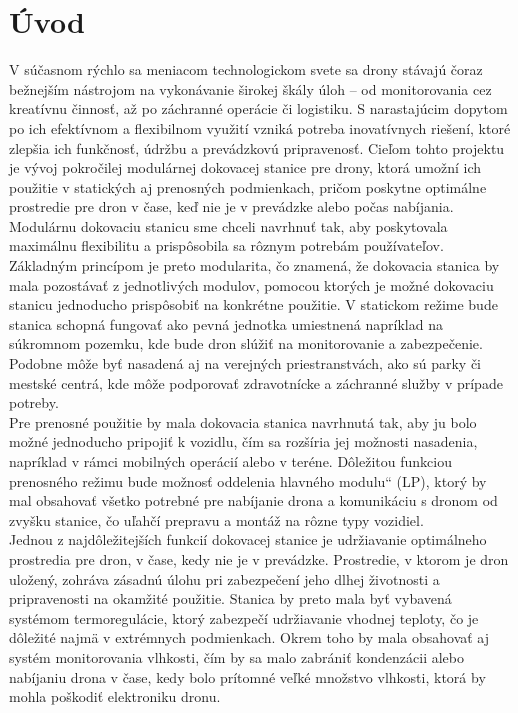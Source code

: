 \documentclass[a4paper]{article}
\newcommand\uvoz[1]{\quotedblbase #1\textquotedblleft}%
\begin{document}
\section{Úvod}
V súčasnom rýchlo sa meniacom technologickom svete sa drony stávajú čoraz bežnejším nástrojom na vykonávanie širokej škály úloh – od monitorovania cez kreatívnu činnosť, až po záchranné operácie či logistiku. S narastajúcim dopytom po ich efektívnom a flexibilnom využití vzniká potreba inovatívnych riešení, ktoré zlepšia ich funkčnosť, údržbu a prevádzkovú pripravenosť. Cieľom tohto projektu je vývoj pokročilej modulárnej dokovacej stanice pre drony, ktorá umožní ich použitie v statických aj prenosných podmienkach, pričom poskytne optimálne prostredie pre dron v čase, keď nie je v prevádzke alebo počas nabíjania.\\

\noindent
Modulárnu dokovaciu stanicu sme chceli navrhnuť tak, aby poskytovala maximálnu flexibilitu a prispôsobila sa rôznym potrebám používateľov. Základným princípom je preto modularita, čo znamená, že dokovacia stanica by mala pozostávať z jednotlivých modulov, pomocou ktorých je možné dokovaciu stanicu jednoducho prispôsobiť na konkrétne použitie. V statickom režime bude stanica schopná fungovať ako pevná jednotka umiestnená napríklad na súkromnom pozemku, kde bude dron slúžiť na monitorovanie a zabezpečenie. Podobne môže byť nasadená aj na verejných priestranstvách, ako sú parky či mestské centrá, kde môže podporovať zdravotnícke a záchranné služby v prípade potreby.\\

\noindent
Pre prenosné použitie by mala dokovacia stanica navrhnutá tak, aby ju bolo možné jednoducho pripojiť k vozidlu, čím sa rozšíria jej možnosti nasadenia, napríklad v rámci mobilných operácií alebo v teréne. Dôležitou funkciou prenosného režimu bude možnosť oddelenia \uvoz{hlavného modulu} (\acs{LP}), ktorý by mal obsahovať všetko potrebné pre nabíjanie drona a komunikáciu s dronom od zvyšku stanice, čo uľahčí prepravu a montáž na rôzne typy vozidiel.\\

\noindent
Jednou z najdôležitejších funkcií dokovacej stanice je udržiavanie optimálneho prostredia pre dron, v čase, kedy nie je v prevádzke. Prostredie, v ktorom je dron uložený, zohráva zásadnú úlohu pri zabezpečení jeho dlhej životnosti a pripravenosti na okamžité použitie. Stanica by preto mala byť vybavená systémom termoregulácie, ktorý zabezpečí udržiavanie vhodnej teploty, čo je dôležité najmä v extrémnych podmienkach. Okrem toho by mala obsahovať aj systém monitorovania vlhkosti, čím by sa malo zabrániť kondenzácii alebo nabíjaniu drona v čase, kedy bolo prítomné veľké množstvo vlhkosti, ktorá by mohla poškodiť elektroniku dronu.\\
\end{document}
